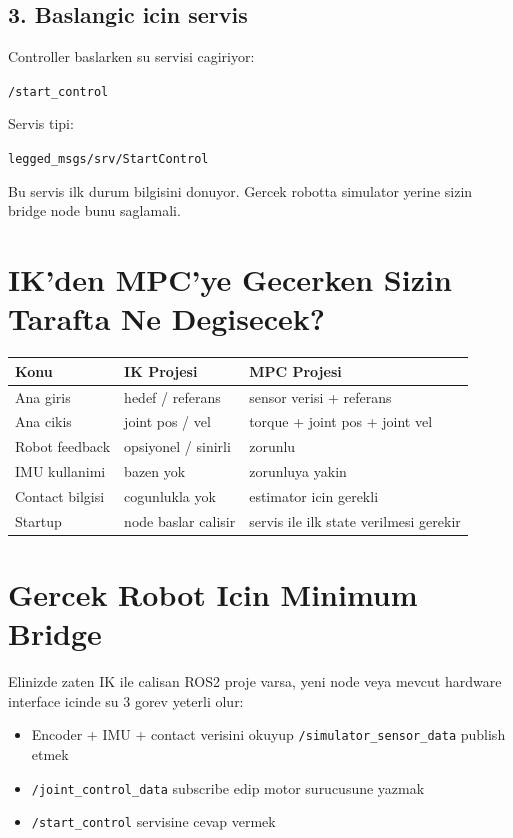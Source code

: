\documentclass[11pt,a4paper]{article}
\begin{document}
\subsection*{3. Baslangic icin servis}
Controller baslarken su servisi cagiriyor:

\begin{center}
\texttt{/start\_control}
\end{center}

Servis tipi:
\begin{center}
\texttt{legged\_msgs/srv/StartControl}
\end{center}

Bu servis ilk durum bilgisini donuyor. Gercek robotta simulator yerine sizin bridge node bunu saglamali.

\section*{IK'den MPC'ye Gecerken Sizin Tarafta Ne Degisecek?}
\begin{longtable}{|p{}|p{}|p{}|}
\hline
\textbf{Konu} & \textbf{IK Projesi} & \textbf{MPC Projesi} \\
\hline
Ana giris & hedef / referans & sensor verisi + referans \\
\hline
Ana cikis & joint pos / vel & torque + joint pos + joint vel \\
\hline
Robot feedback & opsiyonel / sinirli & zorunlu \\
\hline
IMU kullanimi & bazen yok & zorunluya yakin \\
\hline
Contact bilgisi & cogunlukla yok & estimator icin gerekli \\
\hline
Startup & node baslar calisir & servis ile ilk state verilmesi gerekir \\
\hline
\end{longtable}

\section*{Gercek Robot Icin Minimum Bridge}
Elinizde zaten IK ile calisan ROS2 proje varsa, yeni node veya mevcut hardware interface icinde su 3 gorev yeterli olur:

\begin{itemize}
  \item Encoder + IMU + contact verisini okuyup \texttt{/simulator\_sensor\_data} publish etmek
  \item \texttt{/joint\_control\_data} subscribe edip motor surucusune yazmak
  \item \texttt{/start\_control} servisine cevap vermek
\end{itemize}
\end{document}
